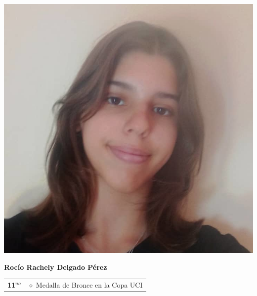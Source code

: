 \begin{minipage}{0.2\textwidth}
	\includegraphics[width=\linewidth]{img/concursantes/rocio.png} %
\end{minipage}
\hfill
\begin{minipage}{0.7\textwidth}
	\textbf{Rocío Rachely Delgado Pérez}
	
	\vspace*{0.1in}
	\begin{tabular}{rl}
		
	
		
		\textbf{11$^{no}$} 
		& $\diamond$ Medalla de Bronce en la Copa UCI \\
		
		
		
	\end{tabular}
\end{minipage}

\vspace*{0.2in}

